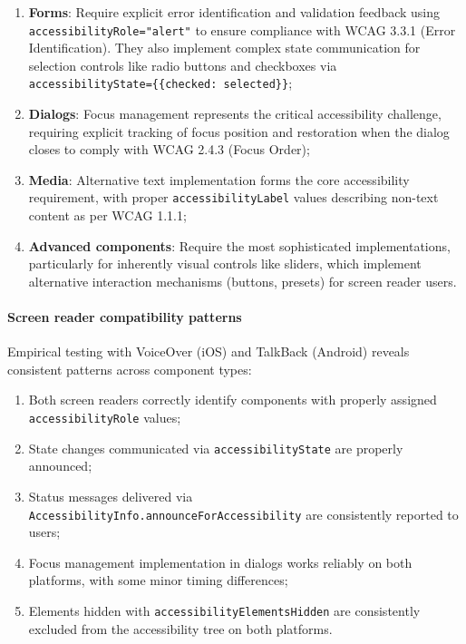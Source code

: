 \begin{enumerate}
    \item \textbf{Forms}: Require explicit error identification and validation feedback using \texttt{accessibilityRole="alert"} to ensure compliance with WCAG 3.3.1 (Error Identification). They also implement complex state communication for selection controls like radio buttons and checkboxes via \\ \texttt{accessibilityState=\{\{checked: selected\}\}};
    
    \item \textbf{Dialogs}: Focus management represents the critical accessibility challenge, requiring explicit tracking of focus position and restoration when the dialog closes to comply with WCAG 2.4.3 (Focus Order);
    
    \item \textbf{Media}: Alternative text implementation forms the core accessibility requirement, with proper \texttt{accessibilityLabel} values describing non-text content as per WCAG 1.1.1;
    
    \item \textbf{Advanced components}: Require the most sophisticated implementations, particularly for inherently visual controls like sliders, which implement alternative interaction mechanisms (buttons, presets) for screen reader users.
\end{enumerate}

\paragraph{Screen reader compatibility patterns}

Empirical testing with VoiceOver (iOS) and TalkBack (Android) reveals consistent patterns across component types:

\begin{enumerate}
    \item Both screen readers correctly identify components with properly assigned \texttt{accessibilityRole} values;
    
    \item State changes communicated via \texttt{accessibilityState} are properly announced;
    
    \item Status messages delivered via \texttt{AccessibilityInfo.announceForAccessibility} are consistently reported to users;
    
    \item Focus management implementation in dialogs works reliably on both platforms, with some minor timing differences;
    
    \item Elements hidden with \texttt{accessibilityElementsHidden} are consistently excluded from the accessibility tree on both platforms.
\end{enumerate}

